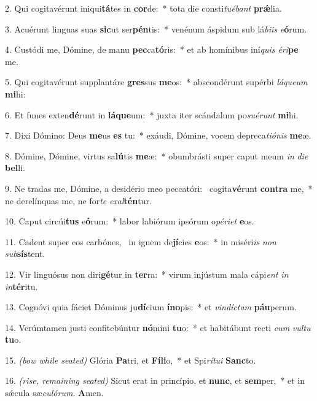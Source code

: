 2. Qui cogitavérunt iniqui\textbf{tá}tes in \textbf{cor}de:~* tota die consti\textit{tu}\textit{é}\textit{bant} \textbf{pr\'{\ae}}lia.

3. Acuérunt linguas suas \textbf{sic}ut ser\textbf{pén}tis:~* venénum áspidum sub lá\textit{bi}\textit{is} \textit{e}\textbf{ó}rum.

4. Custódi me, Dómine, de manu \textbf{pec}ca\textbf{tó}ris:~* et ab homínibus iní\textit{quis} \textit{é}\textit{ri}\textbf{pe} me.

5. Qui cogitavérunt supplantáre \textbf{gres}sus \textbf{me}os:~* abscondérunt supérbi \textit{lá}\textit{que}\textit{um} \textbf{mi}hi:

6. Et funes exten\textbf{dé}runt in \textbf{lá}\textbf{que}um:~* juxta iter scándalum po\textit{su}\textit{é}\textit{runt} \textbf{mi}hi.

7. Dixi Dómino: Deus \textbf{me}us \textbf{es} tu:~* exáudi, Dómine, vocem depreca\textit{ti}\textit{ó}\textit{nis} \textbf{me}æ.

8. Dómine, Dómine, virtus sa\textbf{lú}tis \textbf{me}æ:~* obumbrásti super caput meum \textit{in} \textit{di}\textit{e} \textbf{bel}li.

9. Ne tradas me, Dómine, a desidério meo peccatóri:~{\color{red}\GreDagger} cogita\textbf{vé}runt \textbf{con}\textbf{tra} me,~* ne derelínquas me, ne for\textit{te} \textit{ex}\textit{al}\textbf{tén}tur.

10. Caput circúi\textbf{tus} e\textbf{ó}rum:~* labor labiórum ipsórum o\textit{pé}\textit{ri}\textit{et} \textbf{e}os.

11. Cadent super eos carbónes,~{\color{red}\GreDagger} in ignem de\textbf{jí}cies \textbf{e}os:~* in miséri\textit{is} \textit{non} \textit{sub}\textbf{sís}tent.

12. Vir linguósus non diri\textbf{gé}tur in \textbf{ter}ra:~* virum injústum mala cápi\textit{ent} \textit{in} \textit{in}\textbf{tér}itu.

13. Cognóvi quia fáciet Dóminus ju\textbf{dí}cium \textbf{ín}\textbf{o}pis:~* et \textit{vin}\textit{díc}\textit{tam} \textbf{páu}perum.

14. Verúmtamen justi confitebúntur \textbf{nó}mini \textbf{tu}o:~* et habitábunt recti \textit{cum} \textit{vul}\textit{tu} \textbf{tu}o.

15. {\color{red}\textit{(bow while seated)}} Glória \textbf{Pa}tri, et \textbf{Fí}\textbf{li}o,~* et Spi\textit{rí}\textit{tu}\textit{i} \textbf{Sanc}to.

16. {\color{red}\textit{(rise, remaining seated)}} Sicut erat in princípio, et \textbf{nunc}, et \textbf{sem}per,~* et in s\'{\ae}cula sæ\textit{cu}\textit{ló}\textit{rum}. \textbf{A}men.